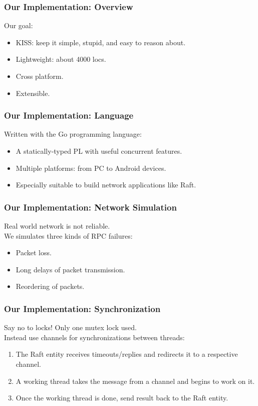 \documentclass{beamer}
\begin{document}
\begin{frame}
\frametitle{Our Implementation: Overview}
Our goal:
\begin{itemize}
\item KISS: keep it simple, stupid, and easy to reason about.
\item Lightweight: about 4000 locs.
\item Cross platform.
\item Extensible.
\end{itemize}
\end{frame}


\begin{frame}
\frametitle{Our Implementation: Language}
Written with the Go programming language:
\begin{itemize}
\item A statically-typed PL with useful concurrent features.
\item Multiple platforms: from PC to Android devices.
\item Especially suitable to build network applications like Raft.
\end{itemize}
\end{frame}


\begin{frame}
\frametitle{Our Implementation: Network Simulation}
Real world network is not reliable.\\[1cm]

We simulates three kinds of RPC failures:
\begin{itemize}
\item Packet loss.
\item Long delays of packet transmission.
\item Reordering of packets.
\end{itemize}
\end{frame}

\begin{frame}
\frametitle{Our Implementation: Synchronization}
{\Large Say no to locks}! Only one mutex lock used.\\[1cm]

Instead use channels for synchronizations between threads:
\begin{enumerate}
\item The Raft entity receives timeouts/replies and redirects it to a respective channel.
\item A working thread takes the message from a channel and begins to work on it.
\item Once the working thread is done, send result back to the Raft entity.
\end{enumerate}
\end{frame}
\end{document}
